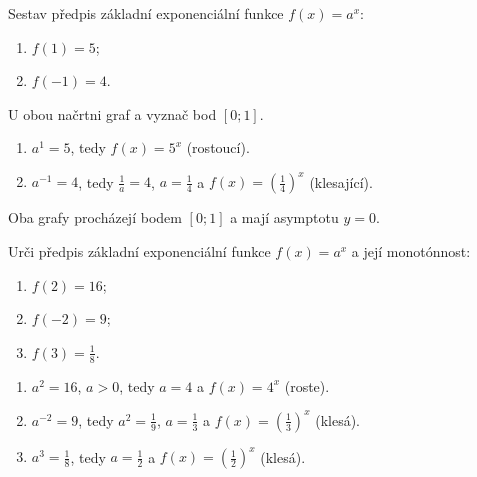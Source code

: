 \documentclass[11pt,a4paper]{article}
\begin{document}
\begin{prikladReseniBox}[title={Příklad 4}]
Sestav předpis základní exponenciální funkce $f(x)=a^x$:
\begin{enumerate}[label=\alph*)]
\item $f(1)=5$;
\item $f(-1)=4$.
\end{enumerate}
U obou načrtni graf a vyznač bod $[0;1]$.
\tcblower
\begin{enumerate}[label=\alph*)]
\item $a^1=5$, tedy $f(x)=5^x$ (rostoucí).
\item $a^{-1}=4$, tedy $\frac{1}{a}=4$, $a=\frac{1}{4}$ a $f(x)=\left(\frac{1}{4}\right)^x$ (klesající).
\end{enumerate}
Oba grafy procházejí bodem $[0;1]$ a mají asymptotu $y=0$.
\end{prikladReseniBox}
\begin{prikladReseniBox}[title={Příklad 5}]
Urči předpis základní exponenciální funkce $f(x)=a^x$ a její monotónnost:
\begin{enumerate}[label=\alph*)]
\item $f(2)=16$;
\item $f(-2)=9$;
\item $f(3)=\frac{1}{8}$.
\end{enumerate}
\tcblower
\begin{enumerate}[label=\alph*)]
\item $a^2=16$, $a>0$, tedy $a=4$ a $f(x)=4^x$ (roste).
\item $a^{-2}=9$, tedy $a^2=\frac{1}{9}$, $a=\frac{1}{3}$ a $f(x)=\left(\frac{1}{3}\right)^x$ (klesá).
\item $a^3=\frac{1}{8}$, tedy $a=\frac{1}{2}$ a $f(x)=\left(\frac{1}{2}\right)^x$ (klesá).
\end{enumerate}
\end{prikladReseniBox}
\end{document}
